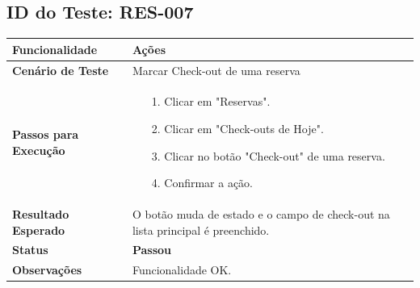 \documentclass[
	12pt,				%
	openany,			%
	oneside,			%
	a4paper,			%
	english,			%
	french,				%
	spanish,			%
	brazil				%
	]{abntex2}
\begin{document}
\begin{apendicesenv}
\subsection*{ID do Teste: RES-007}
\begin{tabular}{@{} p{5cm} p{11cm} @{}}
	\toprule
	\textbf{Funcionalidade} & Ações \\
	\midrule
	\textbf{Cenário de Teste} & Marcar Check-out de uma reserva \\
	\midrule
	\textbf{Passos para Execução} &
	\begin{itemize} \itemsep0em 
		\item[1.] Clicar em "Reservas".
		\item[2.] Clicar em "Check-outs de Hoje".
		\item[3.] Clicar no botão "Check-out" de uma reserva.
		\item[4.] Confirmar a ação.
	\end{itemize} \\
	\midrule
	\textbf{Resultado Esperado} & O botão muda de estado e o campo de check-out na lista principal é preenchido. \\
	\midrule
	\textbf{Status} & \textbf{Passou} \\
	\midrule
	\textbf{Observações} & Funcionalidade OK. \\
	\bottomrule
\end{tabular}
\vspace{1cm}


\end{apendicesenv}
\end{document}
